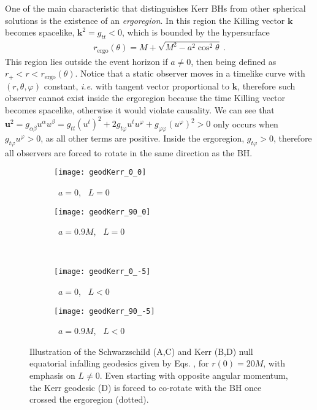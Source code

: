 One of the main characteristic that distinguishes Kerr BHs from other spherical solutions is the existence of an \emph{ergoregion}.
In this region the Killing vector $\bm{k}$ becomes spacelike, $\bm{k}^2=g_{tt}<0$, which is bounded by the hypersurface
\begin{align}
    r_{\mathrm{ergo}}(\theta) = M + \sqrt{M^2 - a^2 \cos^2\theta} ~.
    \label{eq2:KerrErgo}
\end{align}
This region lies outside the event horizon if $a\ne0$, then being defined as $r_+< r < r_{\mathrm{ergo}}(\theta)$.
Notice that a static observer moves in a timelike curve with $(r,\theta,\varphi)$ constant, \emph{i.e.} with tangent vector proportional to $\bm{k}$, therefore such observer cannot exist inside the ergoregion because the time Killing vector becomes spacelike, otherwise it would violate causality.
We can see that $\bm{u}^2=g_{\alpha\beta}u^\alpha u^\beta = g_{tt} (u^t)^2 + 2 g_{t\varphi} u^t u^\varphi +  g_{\varphi\varphi} (u^\varphi)^2 > 0$ only occurs when $g_{t\varphi} u^\varphi > 0$, as all other terms are positive.
Inside the ergoregion, $g_{t\varphi}>0$, therefore all observers are forced to rotate in the same direction as the BH.

\begin{figure}[h]
    \centering
    \vspace{0.5cm}
    \begin{subfigure}[c]{0.4\textwidth}
        \texttt{[image: geodKerr\_0\_0]}
        \caption{ ~$a=0$, ~$L=0$}
    \end{subfigure}
    \hspace{1cm}
    \begin{subfigure}[c]{0.4\textwidth}
        \texttt{[image: geodKerr\_90\_0]}
        \caption{~$a=0.9 M$, ~$L=0$}
    \end{subfigure}
    \\
    \vspace{0.3cm}
    \begin{subfigure}[c]{0.4\textwidth}
        \texttt{[image: geodKerr\_0\_-5]}
        \caption{~$a=0$, ~$L<0$}
    \end{subfigure}
    \hspace{1cm}
    \begin{subfigure}[c]{0.4\textwidth}
        \texttt{[image: geodKerr\_90\_-5]}
        \caption{~$a=0.9 M$, ~$L<0$}
    \end{subfigure}
    \caption{Illustration of the Schwarzschild ({\footnotesize\textsc{A,C}}) and Kerr ({\footnotesize\textsc{B,D}}) null equatorial infalling geodesics given by Eqs. , for $r(0)=20 M$, with emphasis on $L\ne0$. Even starting with opposite angular momentum, the Kerr geodesic ({\footnotesize\textsc{D}}) is forced to co-rotate with the BH once crossed the ergoregion (dotted).}
    \label{fig2:geodesics}
\end{figure}

